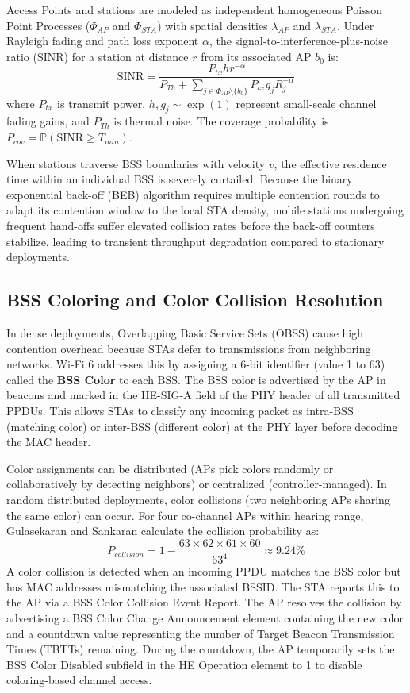 Access Points and stations are modeled as independent homogeneous Poisson Point Processes ($\Phi_{AP}$ and $\Phi_{STA}$) with spatial densities $\lambda_{AP}$ and $\lambda_{STA}$. Under Rayleigh fading and path loss exponent $\alpha$, the signal-to-interference-plus-noise ratio (SINR) for a station at distance $r$ from its associated AP $b_0$ is:
\begin{equation}
    \text{SINR} = \frac{P_{tx} h r^{-\alpha}}{P_{Th} + \sum_{j \in \Phi_{AP} \setminus \{b_0\}} P_{tx} g_j R_j^{-\alpha}}
\end{equation}
where $P_{tx}$ is transmit power, $h, g_j \sim \exp(1)$ represent small-scale channel fading gains, and $P_{Th}$ is thermal noise. The coverage probability is $P_{cov} = \mathbb{P}(\text{SINR} \ge T_{min})$.

When stations traverse BSS boundaries with velocity $v$, the effective residence time within an individual BSS is severely curtailed. Because the binary exponential back-off (BEB) algorithm requires multiple contention rounds to adapt its contention window to the local STA density, mobile stations undergoing frequent hand-offs suffer elevated collision rates before the back-off counters stabilize, leading to transient throughput degradation compared to stationary deployments.

\subsection{BSS Coloring and Color Collision Resolution}
In dense deployments, Overlapping Basic Service Sets (OBSS) cause high contention overhead because STAs defer to transmissions from neighboring networks. Wi-Fi 6 addresses this by assigning a 6-bit identifier (value 1 to 63) called the \textbf{BSS Color} to each BSS. The BSS color is advertised by the AP in beacons and marked in the HE-SIG-A field of the PHY header of all transmitted PPDUs. This allows STAs to classify any incoming packet as intra-BSS (matching color) or inter-BSS (different color) at the PHY layer before decoding the MAC header.

Color assignments can be distributed (APs pick colors randomly or collaboratively by detecting neighbors) or centralized (controller-managed). In random distributed deployments, color collisions (two neighboring APs sharing the same color) can occur. For four co-channel APs within hearing range, Gulasekaran and Sankaran \cite{gulasekaran2021wifi6} calculate the collision probability as:
\begin{equation}
    P_{collision} = 1 - \frac{63 \times 62 \times 61 \times 60}{63^4} \approx 9.24\%
\end{equation}
A color collision is detected when an incoming PPDU matches the BSS color but has MAC addresses mismatching the associated BSSID. The STA reports this to the AP via a BSS Color Collision Event Report. The AP resolves the collision by advertising a BSS Color Change Announcement element containing the new color and a countdown value representing the number of Target Beacon Transmission Times (TBTTs) remaining. During the countdown, the AP temporarily sets the BSS Color Disabled subfield in the HE Operation element to 1 to disable coloring-based channel access.

